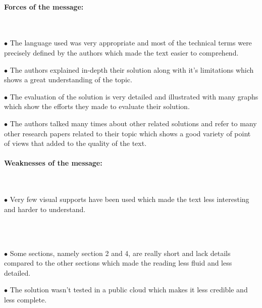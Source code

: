 \documentclass[11pt]{article}
\begin{document}
\paragraph{Forces of the message:}
~\newline
~\newline
\begin{minipage}[t]{1\textwidth}
    \begin{description}
        \item $\bullet$ The language used was very appropriate and most of the technical terms were precisely defined by the authors which made the text easier to comprehend. 
        \item $\bullet$ The authors explained in-depth their solution along with it's limitations which shows a great understanding of the topic.
        \item $\bullet$ The evaluation of the solution is very detailed and illustrated with many graphs which show the efforts they made to evaluate their solution.
        \item $\bullet$ The authors talked many times about other related solutions and refer to many other research papers related to their topic which shows a good variety of point of views that added to the quality of the text.
    \end{description}
\end{minipage}

\paragraph{Weaknesses of the message:}
~\newline
~\newline
\begin{minipage}[t]{1\textwidth}
    \begin{description}
        \item $\bullet$ Very few visual supports have been used which made the text less interesting and harder to understand.
    \end{description}
\end{minipage}
\\
~\newline
\begin{minipage}[t]{1\textwidth}
    \begin{description}
        \item $\bullet$ Some sections, namely section 2 and 4, are really short and lack details compared to the other sections which made the reading less fluid and less detailed. 
        \item $\bullet$ The solution wasn't tested in a public cloud which makes it less credible and less complete. 
    \end{description}
\end{minipage}
\end{document}
